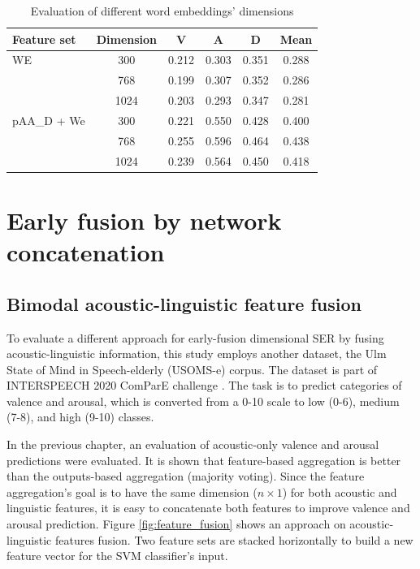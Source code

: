 \begin{table}[htbp]
  \caption{Evaluation of different word embeddings' dimensions}
  \begin{center}
  \begin{tabular}{l | c | c c c c}
    \hline
Feature set & Dimension & V   &   A &   D   &   Mean \\
\hline \hline
WE          & 300   & 0.212   & 0.303 & 0.351 & 0.288 \\
& 768   & 0.199   & 0.307 & 0.352 & 0.286 \\
& 1024  & 0.203   & 0.293 & 0.347 & 0.281 \\
pAA\_D + We & 300   & 0.221   & 0.550 & 0.428 & 0.400 \\
& 768   & 0.255   & 0.596 & 0.464 & 0.438 \\
& 1024  & 0.239   & 0.564 & 0.450 & 0.418 \\
    \hline
  \end{tabular}
  \label{tab:ter_we_dim}
  \end{center}
\end{table}

\section{Early fusion by network concatenation}
\subsection{Bimodal acoustic-linguistic feature fusion}
To evaluate a different approach for early-fusion dimensional SER by fusing
acoustic-linguistic information, this study employs another dataset, the Ulm
State of Mind in Speech-elderly (USOMS-e) corpus. The dataset is part of
INTERSPEECH 2020 ComParE challenge \cite{Schuller}. The task is to predict
categories of valence and arousal, which is converted from a 0-10 scale to low
(0-6), medium (7-8), and high (9-10) classes.

In the previous chapter, an evaluation of acoustic-only valence and arousal
predictions were evaluated. It is shown that feature-based aggregation is
better than the outputs-based aggregation (majority voting). Since the feature
aggregation's goal is to have the same dimension ($n \times 1$) for both
acoustic and linguistic features, it is easy to concatenate both features to
improve valence and arousal prediction. Figure \ref{fig:feature_fusion} shows
an approach on acoustic-linguistic features fusion.  Two feature sets are
stacked horizontally to build a new feature vector for the SVM classifier's
input. 

